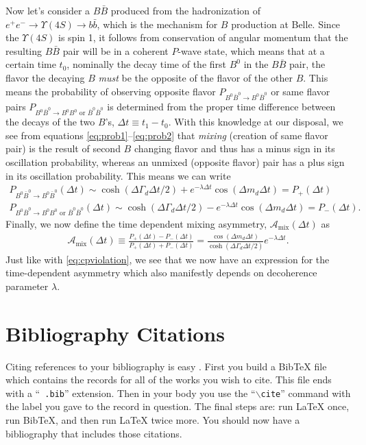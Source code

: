 Now let's consider a $B\bar{B}$ produced from the hadronization of $e^+e^-\rightarrow \Upsilon(4S)\rightarrow b\bar{b}$, which is the mechanism for $B$ production at Belle. Since the $\Upsilon(4S)$ is spin 1, it follows from conservation of angular momentum that the resulting $B\bar{B}$ pair will be in a coherent $P$-wave state, which means that at a certain time $t_0$, nominally the decay time of the first $B^0$ in the $B\bar{B}$ pair, the flavor the decaying $B$ \textit{must} be the opposite of the flavor of the other $B$. This means the probability of observing opposite flavor $P_{B^0\bar{B}^0\rightarrow B^0\bar{B}^0}$ or same flavor pairs $P_{B^0\bar{B}^0\rightarrow B^0B^0 \text{ or } \bar{B}^0\bar{B}^0}$ is determined from the proper time difference between the decays of the two $B$'s, $\Delta t\equiv t_1-t_0$. With this knowledge at our disposal, we see from equations \ref{eq:prob1}--\ref{eq:prob2} that \textit{mixing} (creation of same flavor pair) is the result of second $B$ changing flavor and thus has a minus sign in its oscillation probability, whereas an unmixed (opposite flavor) pair has a plus sign in its oscillation probability. This means we can write
\begin{align}
P_{B^{0}\bar{B}^0\rightarrow B^{0}\bar{B}^0}(\Delta t) \sim \cosh(\Delta \Gamma_d \Delta t/2)+e^{-\lambda \Delta t}\cos(\Delta m_d\Delta t) = P_+(\Delta t)\\
P_{B^{0}\bar{B}^0\rightarrow B^{0}B^0\text{ or } \bar{B}^0\bar{B}^0}(\Delta t) \sim \cosh(\Delta \Gamma_d \Delta t/2)-e^{-\lambda \Delta t}\cos(\Delta m_d\Delta t) = P_-(\Delta t).
\end{align}
Finally, we now define the time dependent mixing asymmetry, $\mathcal{A}_\text{mix}(\Delta t)$ as
\begin{align}
\mathcal{A}_\text{mix}(\Delta t)\equiv \frac{P_+(\Delta t)-P_-(\Delta t)}{P_+(\Delta t)+P_-(\Delta t)} = \frac{\cos(\Delta m_d\Delta t)}{\cosh(\Delta \Gamma_d \Delta t/2)}e^{-\lambda\Delta t}.
\end{align}
Just like with \ref{eq:cpviolation}, we see that we now have an expression for the time-dependent asymmetry which also manifestly depends on decoherence parameter $\lambda$.
\section{Bibliography Citations}
Citing references to your bibliography is easy \cite{belle}
\cite{kekb}. First you build a BibTeX file which contains the
records for all of the works you wish to cite. This file ends with a ``{\tt
.bib}'' extension. Then in your body you use the ``{\tt $\backslash$cite}''
command with the label you gave to the record in question. The final steps are: 
run LaTeX once, run BibTeX, and then run LaTeX twice more. You should now have
a bibliography that includes those citations.

